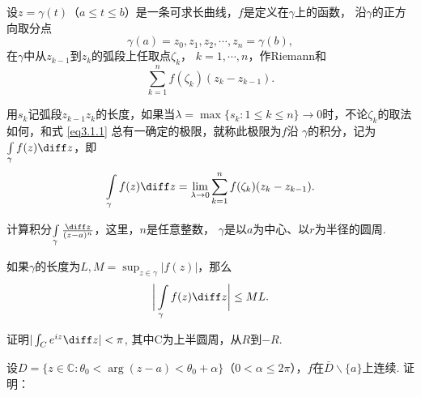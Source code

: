\documentclass{exam}
\begin{document}
\begin{questions}
\question
设$z=\gamma(t)$（$a\le t\le b$）是一条可求长曲线，$f$是定义在$\gamma$上的函数，
沿$\gamma$的正方向取分点\[\gamma(a)=z_0,z_1,z_2,\cdots,z_n=\gamma(b),\]
在$\gamma$中从$z_{k-1}$到$z_k$的弧段上任取点$\zeta_k$， $k=1,\cdots,n$，作Riemann和
\begin{equation}\label{eq3.1.1}
  \sum_{k=1}^n f(\zeta_k) (z_k - z_{k-1}).
\end{equation}

用$s_k$记弧段$z_{k-1}z_k$的长度，如果当$\lambda=\max\{s_k:1\le k\le n\}\to0$时，不论$\zeta_k$的取法如何，和式 \eqref{eq3.1.1} 总有一确定的极限，就称此极限为$f$沿
$\gamma$的积分，记为$\int\limits_\gamma f(z)\diff z$，即
\[
  \int\limits_\gamma f(z)\diff z = \lim_{\lambda\to0}\sum_{k=1}^nf(\zeta_k)(z_k-z_{k-1}).
\]
\begin{figure}[!ht]
\flushleft
\end{figure}

\question
计算积分$\int\limits_\gamma\frac{\diff z}{(z-a)^n}$，这里，$n$是任意整数，
$\gamma$是以$a$为中心、以$r$为半径的圆周.

\newpage

\question
如果$\gamma$的长度为$L,M=\sup_{z\in\gamma}|f(z)|$，那么
\begin{equation}\label{eq3.1.4}
  \bigg|\int\limits_\gamma f(z)\diff z\bigg|\le ML.
\end{equation}

\question
证明$|\int _Ce^{iz}\diff z|<\pi$, 其中C为上半圆周，从$R$到$-R$.
\vspace*{1in}

\question
设$D=\{z\in\mathbb{C}:\theta_0<\operatorname{arg}(z-a)<\theta_0+\alpha\}$（$0<\alpha\le2\pi$），$f$在$\bar D\backslash\{a\}$上连续. 证明：
\end{questions}
\end{document}
